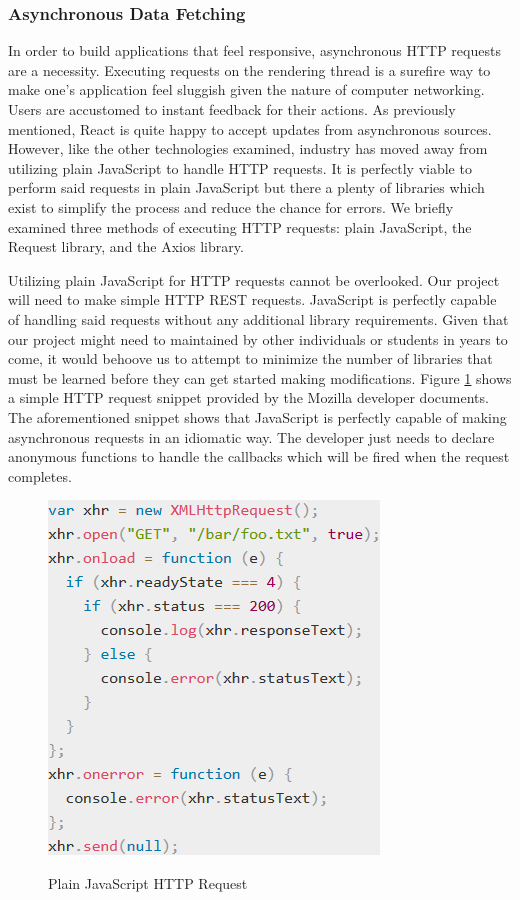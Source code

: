 \documentclass[12pt]{report}
\begin{document}
\subsubsection*{Asynchronous Data Fetching}

In order to build applications that feel responsive, asynchronous HTTP requests are a necessity. Executing requests on the rendering thread is a surefire way to make one's application feel sluggish given the nature of computer networking. Users are accustomed to instant feedback for their actions. As previously mentioned, React is quite happy to accept updates from asynchronous sources. However, like the other technologies examined, industry has moved away from utilizing plain JavaScript to handle HTTP requests. It is perfectly viable to perform said requests in plain JavaScript but there a plenty of libraries which exist to simplify the process and reduce the chance for errors. We briefly examined three methods of executing HTTP requests: plain JavaScript, the Request library, and the Axios library.

Utilizing plain JavaScript for HTTP requests cannot be overlooked. Our project will need to make simple HTTP REST requests. JavaScript is perfectly capable of handling said requests without any additional library requirements. Given that our project might need to maintained by other individuals or students in years to come, it would behoove us to attempt to minimize the number of libraries that must be learned before they can get started making modifications. Figure \ref{fig:javascripthttprequest} shows a simple HTTP request snippet provided by the Mozilla developer documents.\cite{mozillahttprequest} The aforementioned snippet shows that JavaScript is perfectly capable of making asynchronous requests in an idiomatic way. The developer just needs to declare anonymous functions to handle the callbacks which will be fired when the request completes.

\begin{figure}[h]
	\centering
	\caption{Plain JavaScript HTTP Request}
	\includegraphics[scale=0.5]{javascript_http_request}
	\label{fig:javascripthttprequest}
\end{figure}
\end{document}
